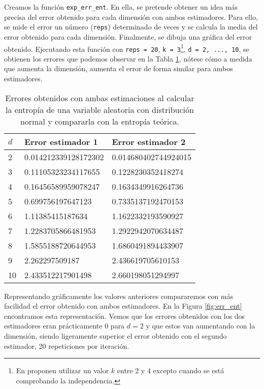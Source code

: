 \documentclass[12pt,a4paper]{report} %
\theoremstyle{definition}
\begin{document}
Creamos la función \texttt{exp\_err\_ent}. En ella, se pretende obtener un idea más precisa del error obtenido para cada dimensión con ambos estimadores. Para ello, se mide el error un número (\texttt{reps}) determinado de veces y se calcula la media del error obtenido para cada dimensión. Finalmente, se dibuja una gráfica del error obtenido. Ejecutando esta función con \texttt{reps = 20}, \texttt{k = 3}\footnote{En \cite{kraskov} proponen utilizar un valor $k$ entre 2 y 4 excepto cuando se está comprobando la independencia.}, \texttt{d = 2, ..., 10}, se obtienen los errores que podemos observar en la Tabla \ref{tab:err_ent}, nótese cómo a medida que aumenta la dimensión, aumenta el error de forma similar para ambos estimadores.\\

\begin{table}[!htb]
\centering
\caption{Errores obtenidos con ambas estimaciones al calcular la entropía de una variable aleatoria con distribución normal y compararla con la entropía teórica.}
\label{tab:err_ent}
\begin{tabular}{lll}
\toprule
$d$ & Error estimador 1 & Error estimador 2\\ \midrule
2 & 0.014212339128172302 & 0.014680402744924015\\
3 & 0.11105323234117655 & 0.1228230352418274\\
4 & 0.16456589959078247 & 0.1634349916264736\\
5 & 0.699756197647123 & 0.7335137192470153\\
6 & 1.11385415187634 & 1.1622332193590927\\
7 & 1.2283705866481953 & 1.2922942070634487\\
8 & 1.5855188720644953 & 1.6860491894433907\\
9 & 2.262297509187 & 2.436619705610153\\
10 & 2.433512217901498 & 2.660198051294997\\
\bottomrule
\end{tabular}
\end{table}

Representando gráficamente los valores anteriores compararemos con más facilidad el error obtenido con ambos estimadores. En la Figura \ref{fig:err_ent} encontramos esta representación. Vemos que los errores obtenidos con los dos estimadores eran prácticamente $0$ para $d=2$ y que estos van aumentando con la dimensión, siendo ligeramente superior el error obtenido con el segundo estimador, 20 repeticiones por iteración.\\
\end{document}

